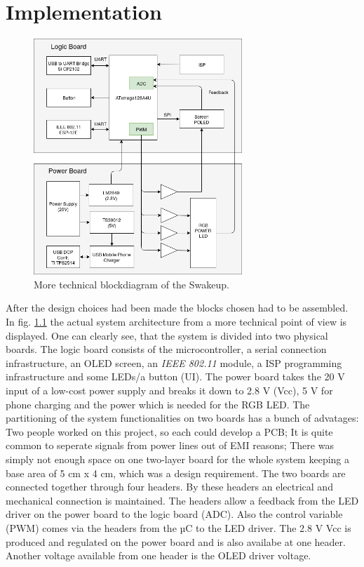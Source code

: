 \chapter{Implementation}
\label{chap:implementation}

\begin{figure}[H]
	\centering
	\label{fig:block}
	\includegraphics[width=0.7\textwidth]{../block/block.png}
	\caption{More technical blockdiagram of the Swakeup.}
\end{figure}

After the design choices had been made the blocks chosen had to be assembled. In fig. \ref{fig:block} the actual system architecture from a more technical
point of view is displayed. One can clearly see, that the system is divided into two physical boards. The logic board consists of the microcontroller, a serial
connection infrastructure, an OLED screen, an \textit{IEEE 802.11} module, a ISP
programming infrastructure and some LEDs/a button (UI).
\newpar  
The power board takes the 20 V input of a low-cost power supply and breaks it
down to 2.8 V (Vcc), 5 V for phone charging and the power which is needed for
the RGB LED.
\newpar
The partitioning of the system functionalities on two boards has a bunch of
advatages: Two people worked on this project, so each could develop a PCB; It is
quite common to seperate signals from power lines out of EMI reasons; There was
simply not enough space on one two-layer board for the whole system keeping a
base area of 5 cm x 4 cm, which was a design requirement. 
\newpar
The two boards are connected together through four headers. By these headers an
electrical and mechanical connection is maintained. The headers allow a feedback
from the LED driver on the power board to the logic board (ADC). Also the
control variable (PWM) comes via the headers from the µC to the LED driver. The
2.8 V Vcc is produced and regulated on the power board and is also availabe at
one header. Another voltage available from one header is the OLED driver
voltage. 

